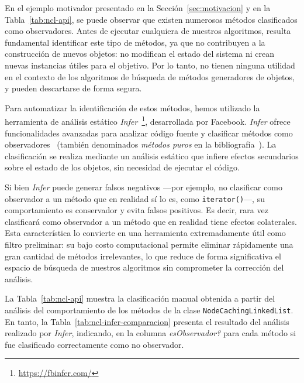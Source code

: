 En el ejemplo motivador presentado en la Sección~\ref{sec:motivacion} y en la Tabla~\ref{tab:ncl-api}, se puede observar que existen numerosos métodos clasificados como observadores. 
Antes de ejecutar cualquiera de nuestros algoritmos, resulta fundamental identificar este tipo de métodos, ya que no contribuyen a la construcción de nuevos objetos: no modifican el estado del sistema ni crean nuevas instancias útiles para el objetivo. 
Por lo tanto, no tienen ninguna utilidad en el contexto de los algoritmos de búsqueda de métodos generadores de objetos, y pueden descartarse de forma segura.

Para automatizar la identificación de estos métodos, hemos utilizado la herramienta de análisis estático \emph{Infer}~\footnote{\url{https://fbinfer.com/}}, desarrollada por Facebook. 
\emph{Infer} ofrece funcionalidades avanzadas para analizar código fuente y clasificar métodos como observadores~\cite{Huang:2012} (también denominados \emph{métodos puros} en la bibliografía~\cite{Salcianu:2005}).
La clasificación se realiza mediante un análisis estático que infiere efectos secundarios sobre el estado de los objetos, sin necesidad de ejecutar el código.

Si bien \emph{Infer} puede generar falsos negativos —por ejemplo, no clasificar como observador a un método que en realidad sí lo es, como \texttt{iterator()}—, su comportamiento es conservador y evita falsos positivos. 
Es decir, rara vez clasificará como observador a un método que en realidad tiene efectos colaterales. 
Esta característica lo convierte en una herramienta extremadamente útil como filtro preliminar: su bajo costo computacional permite eliminar rápidamente una gran cantidad de métodos irrelevantes, 
lo que reduce de forma significativa el espacio de búsqueda de nuestros algoritmos sin comprometer la corrección del análisis.

La Tabla~\ref{tab:ncl-api} muestra la clasificación manual obtenida a partir del análisis del comportamiento de los métodos de la clase \texttt{NodeCachingLinkedList}.
En tanto, la Tabla~\ref{tab:ncl-infer-comparacion} presenta el resultado del análisis realizado por \emph{Infer}, indicando, en la columna \emph{esObservador?} para cada método si fue clasificado correctamente como no observador.

